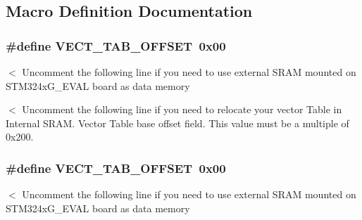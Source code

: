 \subsection{Macro Definition Documentation}
\hypertarget{group___s_t_m32_f4xx___system___private___defines_ga40e1495541cbb4acbe3f1819bd87a9fe}{
\subsubsection[{V\-E\-C\-T\-\_\-\-T\-A\-B\-\_\-\-O\-F\-F\-S\-E\-T}]{\setlength{\rightskip}{0pt plus 5cm}\#define V\-E\-C\-T\-\_\-\-T\-A\-B\-\_\-\-O\-F\-F\-S\-E\-T~0x00}}\label{group___s_t_m32_f4xx___system___private___defines_ga40e1495541cbb4acbe3f1819bd87a9fe}
$<$ Uncomment the following line if you need to use external S\-R\-A\-M mounted on S\-T\-M324x\-G\-\_\-\-E\-V\-A\-L board as data memory

$<$ Uncomment the following line if you need to relocate your vector Table in Internal S\-R\-A\-M. Vector Table base offset field. This value must be a multiple of 0x200. \hypertarget{group___s_t_m32_f4xx___system___private___defines_ga40e1495541cbb4acbe3f1819bd87a9fe}{
\subsubsection[{V\-E\-C\-T\-\_\-\-T\-A\-B\-\_\-\-O\-F\-F\-S\-E\-T}]{\setlength{\rightskip}{0pt plus 5cm}\#define V\-E\-C\-T\-\_\-\-T\-A\-B\-\_\-\-O\-F\-F\-S\-E\-T~0x00}}\label{group___s_t_m32_f4xx___system___private___defines_ga40e1495541cbb4acbe3f1819bd87a9fe}
$<$ Uncomment the following line if you need to use external S\-R\-A\-M mounted on S\-T\-M324x\-G\-\_\-\-E\-V\-A\-L board as data memory


